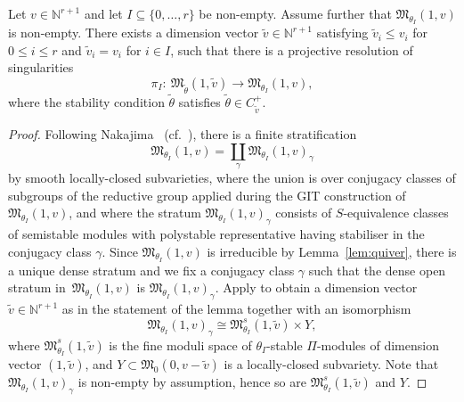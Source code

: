 \begin{Proposition}\label{prop:surjvar}
Let $v \in \mathbb{N}^{r+1}$ and let $ I \subseteq \{0, \dots , r\}$ be non-empty. Assume further that
$\mathfrak{M}_{\theta_I}(1,v)$ is non-empty.
There exists a dimension vector $\widetilde{v}\in \mathbb{N}^{r+1}$ satisfying $\widetilde{v}_i \leq v_i$ for $0 \leq i \leq r$ and $\widetilde{v}_i = v_i$ for $i \in I$,
such that there is a projective resolution of singularities
\[
\pi_{I}\colon \ \mathfrak{M}_{\widetilde{\theta}}(1,\widetilde{v})\to \mathfrak{M}_{\theta_I}(1,v),
\]
where the stability condition $\widetilde{\theta}$ satisfies $\widetilde\theta\in C_{\widetilde v}^+$.
\end{Proposition}
\begin{proof}
 Following Nakajima~\cite[Section 6]{nakajima1994instantons} (cf.\ \cite[Section 3.5]{bellamy2020birational}),
 there is a finite stratification
\begin{equation*}
\mathfrak{M}_{\theta_I}(1,v) = \coprod_{\gamma} \mathfrak{M}_{\theta_I}(1,v)_{\gamma} \end{equation*}
by smooth locally-closed subvarieties, where the union is over conjugacy classes of subgroups of the reductive group applied during the GIT construction of $\mathfrak{M}_{\theta_I}(1,v)$, and where the stratum $\mathfrak{M}_{\theta_I}(1,v)_{\gamma}$ consists of $S$-equivalence classes of semistable modules with polystable representative having stabiliser in the conjugacy class $\gamma$. Since $\mathfrak{M}_{\theta_I}(1,v)$ is irreducible by Lemma~\ref{lem:quiver}, there is a unique dense stratum and we fix a conjugacy class $\gamma$
 such that the dense open stratum in~$\mathfrak{M}_{\theta_I}(1,v)$ is $\mathfrak{M}_{\theta_I}(1,v)_\gamma$. Apply \cite[Proposition 2.25]{nakajima2009quiver} to obtain a dimension vector $\widetilde{v}\in \mathbb{N}^{r+1}$ as in the statement of the lemma
 together with an isomorphism
\begin{equation} \label{eqn:gammaIsom}
\mathfrak{M}_{\theta_I}(1,v)_{\gamma} \cong \mathfrak{M}^s_{\theta_I}(1,\widetilde{v}) \times {Y},
\end{equation}
 where $\mathfrak{M}^s_{\theta_I}(1,\widetilde{v})$ is the fine moduli space of $\theta_I$-stable $\Pi$-modules of dimension vector $(1,\widetilde{v})$, and ${Y} \subset \mathfrak{M}_{0}(0,v-\widetilde{v})$ is a locally-closed subvariety.
 Note that $\mathfrak{M}_{\theta_I}(1,v)_{\gamma}$ is non-empty by assumption, hence so are $\mathfrak{M}^s_{\theta_I}(1,\widetilde{v})$ and ${Y}$.


\end{proof}
